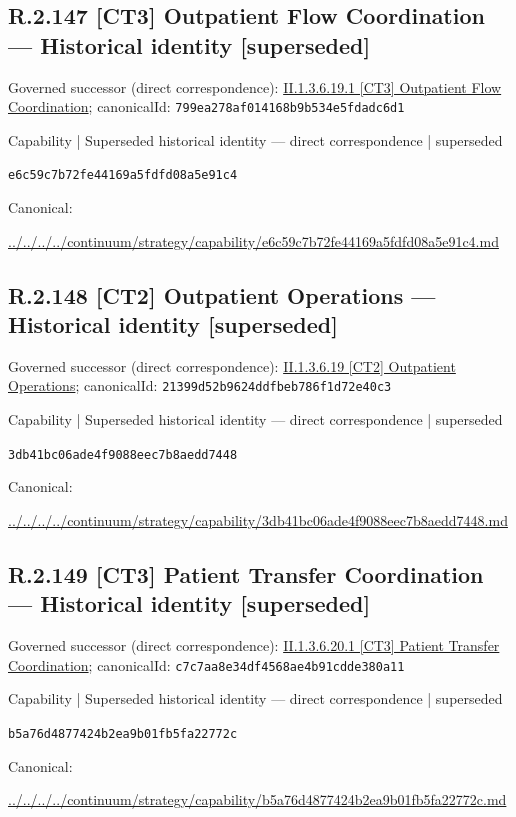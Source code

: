 \documentclass[10pt,a4paper]{article}
\begin{document}
\subsection*{R.2.147 [CT3] Outpatient Flow Coordination — Historical identity [superseded]}
Governed successor (direct correspondence): \hyperref[element-799ea278af014168b9b534e5fdadc6d1]{II.1.3.6.19.1 [CT3] Outpatient Flow Coordination}; canonicalId: \texttt{799ea278af014168b9b534e5fdadc6d1}\par
\label{element-e6c59c7b72fe44169a5fdfd08a5e91c4}
{\small Capability | Superseded historical identity — direct correspondence | superseded}\par
\texttt{e6c59c7b72fe44169a5fdfd08a5e91c4}\par
Canonical: \par
{\footnotesize\url{../../../../continuum/strategy/capability/e6c59c7b72fe44169a5fdfd08a5e91c4.md}}\par
\subsection*{R.2.148 [CT2] Outpatient Operations — Historical identity [superseded]}
Governed successor (direct correspondence): \hyperref[element-21399d52b9624ddfbeb786f1d72e40c3]{II.1.3.6.19 [CT2] Outpatient Operations}; canonicalId: \texttt{21399d52b9624ddfbeb786f1d72e40c3}\par
\label{element-3db41bc06ade4f9088eec7b8aedd7448}
{\small Capability | Superseded historical identity — direct correspondence | superseded}\par
\texttt{3db41bc06ade4f9088eec7b8aedd7448}\par
Canonical: \par
{\footnotesize\url{../../../../continuum/strategy/capability/3db41bc06ade4f9088eec7b8aedd7448.md}}\par
\subsection*{R.2.149 [CT3] Patient Transfer Coordination — Historical identity [superseded]}
Governed successor (direct correspondence): \hyperref[element-c7c7aa8e34df4568ae4b91cdde380a11]{II.1.3.6.20.1 [CT3] Patient Transfer Coordination}; canonicalId: \texttt{c7c7aa8e34df4568ae4b91cdde380a11}\par
\label{element-b5a76d4877424b2ea9b01fb5fa22772c}
{\small Capability | Superseded historical identity — direct correspondence | superseded}\par
\texttt{b5a76d4877424b2ea9b01fb5fa22772c}\par
Canonical: \par
{\footnotesize\url{../../../../continuum/strategy/capability/b5a76d4877424b2ea9b01fb5fa22772c.md}}\par
\end{document}
